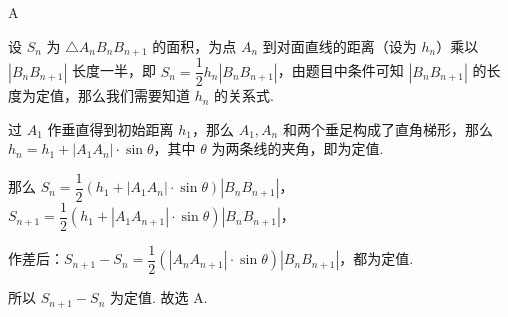 \begin{answer}
A
\end{answer}

\begin{solutions}
设  $S_n$ 为 $\triangle A_nB_nB_{n+1}$ 的面积，为点 $A_n$ 到对面直线的距离（设为 $h_n$）乘以 $|B_nB_{n+1}|$ 长度一半，即 $S_n = \dfrac{1}{2}h_n|B_nB_{n+1}|$，由题目中条件可知 $|B_nB_{n+1}|$ 的长度为定值，那么我们需要知道 $h_n$ 的关系式.

过 $A_1$ 作垂直得到初始距离 $h_1$，那么 $A_1, A_n$ 和两个垂足构成了直角梯形，那么
$h_n = h_1 + |A_1A_n| \cdot \sin\theta$，其中 $\theta$ 为两条线的夹角，即为定值.

那么 $S_n = \dfrac{1}{2}(h_1 + |A_1A_n| \cdot \sin\theta)|B_nB_{n+1}|$，
$S_{n+1} = \dfrac{1}{2}(h_1 + |A_1A_{n+1}| \cdot \sin\theta)|B_nB_{n+1}|$，

作差后：$S_{n+1} - S_n = \dfrac{1}{2}(|A_nA_{n+1}| \cdot \sin\theta)|B_nB_{n+1}|$，都为定值.

所以 $S_{n+1} - S_n$ 为定值. 故选 A.
\end{solutions}